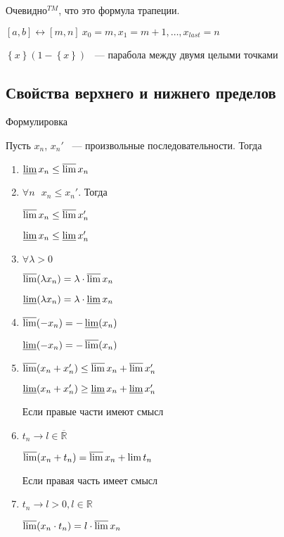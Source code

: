 \documentclass[../main.tex]{subfiles}
\begin{document}
			Очевидно$^{TM}$, что это формула трапеции.

			$[a, b] \leftrightarrow [m, n] \ x_0 = m, x_1 = m + 1, \ldots, x_{last} = n$

			$\left\{ x \right\} (1 - \left\{ x \right\})$ ~--- парабола между двумя целыми точками
\newpage


\subsection{Свойства верхнего и нижнего пределов}
Формулировка
$$$$
    
            Пусть $x_n$, $x_n'$ ~--- произвольные последовательности. Тогда
            
            \begin{enumerate}
            
                \item $\varliminf x_n \leq \varlimsup x_n$
                
                \item $\forall n \ \ \ x_n \leq x_n'$. Тогда
                
                    $\varlimsup x_n \leq \varlimsup x_n'$
                    
                    $\varliminf x_n \leq \varliminf x_n'$
                    
                \item $\forall \lambda > 0$
                
                    $\varlimsup(\lambda x_n) = \lambda \cdot \varlimsup x_n$
                    
                    $\varliminf(\lambda x_n) = \lambda \cdot \varliminf x_n$
                    
                \item $\varlimsup (-x_n) = -\varliminf(x_n)$
                
                    $\varliminf (-x_n) = -\varlimsup(x_n)$
                    
                \item $\varlimsup (x_n + x_n') \leq \varlimsup x_n + \varlimsup x_n'$
                    
                    $\varliminf (x_n + x_n') \geq \varliminf x_n + \varliminf x_n'$
                    
                    Если правые части имеют смысл
                    
                \item $t_n \rightarrow l \in \overline{\mathbb{R}}$ 
                
                    $\varlimsup (x_n + t_n) = \varlimsup x_n + \lim t_n$
                
                    Если правая часть имеет смысл
                    
                \item $t_n \rightarrow l > 0, l \in \mathbb{R}$ 
                
                    $\varlimsup(x_n \cdot t_n) = l \cdot \varlimsup x_n$
                
            \end{enumerate}
            
\end{document}
